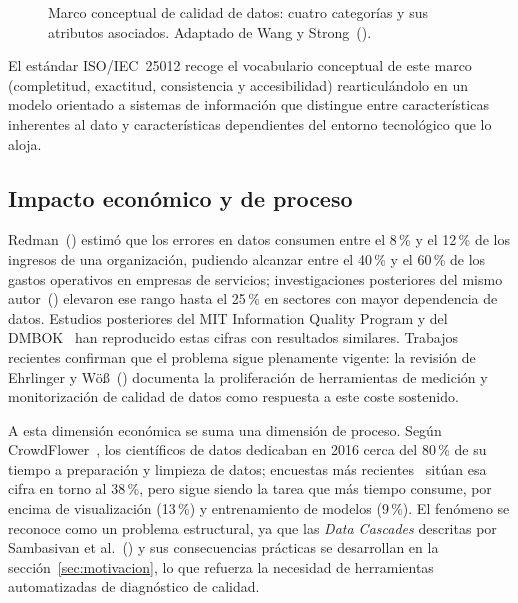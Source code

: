 \begin{figure}[H]
  \caption[Marco conceptual de calidad de datos de Wang y Strong]{Marco
    conceptual de calidad de datos: cuatro categorías y sus atributos
    asociados. Adaptado de Wang y Strong~(\citeyear{wang1996}).}
  \label{fig:wang-strong}
\end{figure}

El estándar \ac{ISO}/\ac{IEC}~25012 recoge el vocabulario conceptual de este
marco (completitud, exactitud, consistencia y accesibilidad) rearticulándolo
en un modelo orientado a sistemas de información que distingue entre
características inherentes al dato y características dependientes del entorno
tecnológico que lo aloja.

\subsection{Impacto económico y de proceso}

Redman~(\citeyear{redman1998}) estimó que los errores en datos consumen
entre el 8\,\% y el 12\,\% de los ingresos de una organización, pudiendo
alcanzar entre el 40\,\% y el 60\,\% de los gastos operativos en empresas
de servicios; investigaciones posteriores del mismo
autor~(\citeyear{redman2001}) elevaron ese rango hasta el 25\,\% en
sectores con mayor dependencia de datos.  Estudios posteriores del MIT
Information Quality Program y del \ac{DMBOK}~\citep{dmbok2017} han
reproducido estas cifras con resultados similares.  Trabajos recientes
confirman que el problema sigue plenamente vigente: la revisión de
Ehrlinger y Wöß~(\citeyear{ehrlinger2022}) documenta la proliferación de
herramientas de medición y monitorización de calidad de datos como
respuesta a este coste sostenido.

A esta dimensión económica se suma una dimensión de proceso.  Según
CrowdFlower~\citep{crowdflower2016}, los científicos de datos dedicaban
en 2016 cerca del 80\,\% de su tiempo a preparación y limpieza de datos;
encuestas más recientes~\citep{anaconda2022} sitúan esa cifra en torno
al 38\,\%, pero sigue siendo la tarea que más tiempo consume, por encima
de visualización (13\,\%) y entrenamiento de modelos (9\,\%).  El
fenómeno se reconoce como un problema estructural, ya que las \emph{Data
Cascades} descritas por Sambasivan et al.~(\citeyear{sambasivan2021}) y
sus consecuencias prácticas se desarrollan en la
sección~\ref{sec:motivacion}, lo que refuerza la necesidad de
herramientas automatizadas de diagnóstico de calidad.

